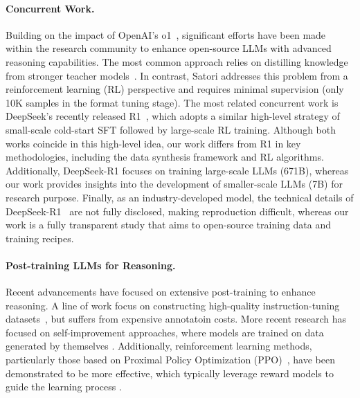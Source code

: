 \paragraph{Concurrent Work.}
Building on the impact of OpenAI's o1~\cite{o1}, significant efforts have been made within the research community to enhance open-source LLMs with advanced reasoning capabilities. The most common approach relies on distilling knowledge from stronger teacher models~\cite{o1journey2, marcoo1, min2024imitate}. In contrast, Satori addresses this problem from a reinforcement learning (RL) perspective and requires minimal supervision (only 10K samples in the format tuning stage). The most related concurrent work is DeepSeek’s recently released R1~\cite{guo2025deepseek}, which adopts a similar high-level strategy of small-scale cold-start SFT followed by large-scale RL training. Although both works coincide in this high-level idea, our work differs from R1 in key methodologies, including the data synthesis framework and RL algorithms. Additionally, DeepSeek-R1 focuses on training large-scale LLMs (671B), whereas our work provides insights into the development of smaller-scale LLMs (7B) for research purpose. Finally, as an industry-developed model, the technical details of DeepSeek-R1~\cite{guo2025deepseek} are not fully disclosed, making reproduction difficult, whereas our work is a fully transparent study that aims to open-source training data and training recipes. 

\paragraph{Post-training LLMs for Reasoning.}
Recent advancements have focused on extensive post-training to enhance reasoning. A line of work focus on constructing high-quality instruction-tuning datasets~\cite{MATH, mammoth, metamath, openmathinstruct2, scalequest}, but suffers from expensive annotatoin costs. More recent research has focused on self-improvement approaches, where models are trained on data generated by themselves \cite{star, quietstar, singh2023beyond, cpo}. Additionally, reinforcement learning methods, particularly those based on Proximal Policy Optimization (PPO)~\cite{ppo, rlhf}, have been demonstrated to be more effective, which typically leverage reward models to guide the learning process \cite{easytohard, mathshepherd, yuan2024implicitprm}.

